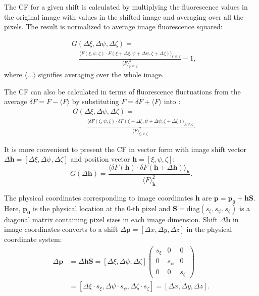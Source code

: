 The \ac{CF} for a given shift is calculated by
multiplying the fluorescence values in the original image with
values in the shifted image and averaging over all the pixels. The
result is normalized to average image fluorescence squared:

\begin{align}  
  \label{eq:first}
  &G(\Delta\xi,\Delta\psi,\Delta\zeta)= \\
  &\quad \frac{\langle F(\xi,\psi,\zeta)
  \cdot F(\xi + \Delta\xi, \psi +
  \Delta\psi,\zeta+\Delta\zeta)\rangle_{\xi,\psi,\zeta}}{\langle F
  \rangle_{\xi,\psi,\zeta}^2} - 1,\nonumber
\end{align}
where $\langle\ldots\rangle$ signifies averaging over the whole
image.

The \ac{CF} can also be calculated in terms of
fluorescence fluctuations from the average $\delta F=F-\langle F
\rangle$ by substituting $F=\delta F +\langle F \rangle$ into
\Eq{~\ref{eq:first}}:
\begin{align*}
  &G(\Delta\xi,\Delta\psi,\Delta\zeta)= \\
  &\qquad\frac{\langle \delta F(\xi,\psi,\zeta) \cdot \delta F(\xi +\Delta
  \xi, \psi +
  \Delta\psi,\zeta+\Delta\zeta)\rangle_{\xi,\psi,\zeta}}{\langle F
  \rangle_{\xi,\psi,\zeta}^2}.
\end{align*}

It is more convenient to present the \ac{CF} in vector form with image shift vector
$\Delta \mathbf{h}=\left[\Delta\xi,\Delta\psi,\Delta\zeta\right]$ and
position vector $\mathbf{h} = [\xi,\psi,\zeta]$:
\begin{equation}\label{eq:G_def}
 G(\Delta \mathbf{h}) = \frac{\langle \delta F(\mathbf{h}) \cdot
 \delta F(\mathbf{h} +\Delta \mathbf{h})\rangle_{\mathbf{h}}}{\langle
 F \rangle_{\mathbf{h}}^2}.
\end{equation}


The physical coordinates corresponding to image coordinates $\mathbf{h}$
are $\mathbf{p} =
\mathbf{p_0}+\mathbf{h}\mathbf{S}$. Here,
$\mathbf{p_0}$ is the physical location at the 0-th pixel
and $\mathbf{S} = \mathrm{diag}(s_\xi, s_\psi, s_\zeta)$ is a diagonal
matrix containing pixel sizes in each image dimension.
Shift $\Delta \mathbf{h}$ in image coordinates converts to a shift 
$\Delta \mathbf{p} =[\Delta x, \Delta y, \Delta z] $  
in the physical coordinate system:
\begin{align*}
  \Delta \mathbf{p}&=\Delta \mathbf{h}\mathbf{S}=
  [\Delta\xi,\Delta\psi,\Delta\zeta]
  \begin{pmatrix}
s_\xi&0&0\\
0&s_\psi&0\\
0&0&s_\zeta
  \end{pmatrix}\\
  &= 
[\Delta \xi \cdot s_\xi, \Delta \psi \cdot s_\psi, \Delta \zeta \cdot s_\zeta]
=[\Delta x, \Delta y, \Delta z].
 \end{align*}

